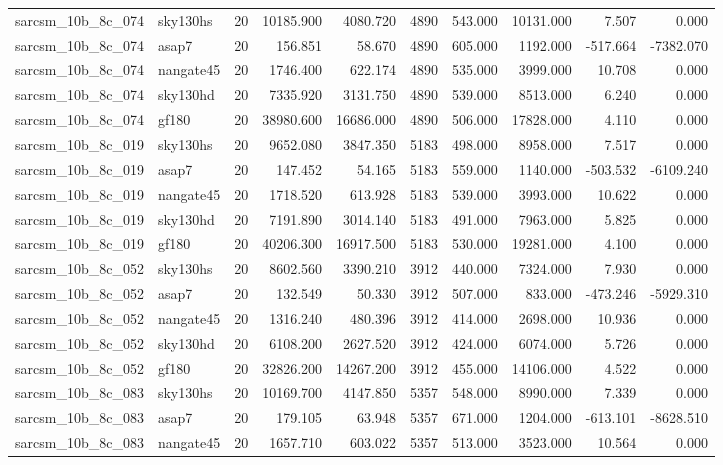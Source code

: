 \documentclass{article}
\begin{document}
\begin{longtable}{llrrrrrrrr}
sarcsm\_10b\_8c\_074 & sky130hs & 20 & 10185.900 & 4080.720 & 4890 & 543.000 & 10131.000 & 7.507 & 0.000 \\
sarcsm\_10b\_8c\_074 & asap7 & 20 & 156.851 & 58.670 & 4890 & 605.000 & 1192.000 & -517.664 & -7382.070 \\
sarcsm\_10b\_8c\_074 & nangate45 & 20 & 1746.400 & 622.174 & 4890 & 535.000 & 3999.000 & 10.708 & 0.000 \\
sarcsm\_10b\_8c\_074 & sky130hd & 20 & 7335.920 & 3131.750 & 4890 & 539.000 & 8513.000 & 6.240 & 0.000 \\
sarcsm\_10b\_8c\_074 & gf180 & 20 & 38980.600 & 16686.000 & 4890 & 506.000 & 17828.000 & 4.110 & 0.000 \\
sarcsm\_10b\_8c\_019 & sky130hs & 20 & 9652.080 & 3847.350 & 5183 & 498.000 & 8958.000 & 7.517 & 0.000 \\
sarcsm\_10b\_8c\_019 & asap7 & 20 & 147.452 & 54.165 & 5183 & 559.000 & 1140.000 & -503.532 & -6109.240 \\
sarcsm\_10b\_8c\_019 & nangate45 & 20 & 1718.520 & 613.928 & 5183 & 539.000 & 3993.000 & 10.622 & 0.000 \\
sarcsm\_10b\_8c\_019 & sky130hd & 20 & 7191.890 & 3014.140 & 5183 & 491.000 & 7963.000 & 5.825 & 0.000 \\
sarcsm\_10b\_8c\_019 & gf180 & 20 & 40206.300 & 16917.500 & 5183 & 530.000 & 19281.000 & 4.100 & 0.000 \\
sarcsm\_10b\_8c\_052 & sky130hs & 20 & 8602.560 & 3390.210 & 3912 & 440.000 & 7324.000 & 7.930 & 0.000 \\
sarcsm\_10b\_8c\_052 & asap7 & 20 & 132.549 & 50.330 & 3912 & 507.000 & 833.000 & -473.246 & -5929.310 \\
sarcsm\_10b\_8c\_052 & nangate45 & 20 & 1316.240 & 480.396 & 3912 & 414.000 & 2698.000 & 10.936 & 0.000 \\
sarcsm\_10b\_8c\_052 & sky130hd & 20 & 6108.200 & 2627.520 & 3912 & 424.000 & 6074.000 & 5.726 & 0.000 \\
sarcsm\_10b\_8c\_052 & gf180 & 20 & 32826.200 & 14267.200 & 3912 & 455.000 & 14106.000 & 4.522 & 0.000 \\
sarcsm\_10b\_8c\_083 & sky130hs & 20 & 10169.700 & 4147.850 & 5357 & 548.000 & 8990.000 & 7.339 & 0.000 \\
sarcsm\_10b\_8c\_083 & asap7 & 20 & 179.105 & 63.948 & 5357 & 671.000 & 1204.000 & -613.101 & -8628.510 \\
sarcsm\_10b\_8c\_083 & nangate45 & 20 & 1657.710 & 603.022 & 5357 & 513.000 & 3523.000 & 10.564 & 0.000 \\

\end{longtable}
\end{document}
